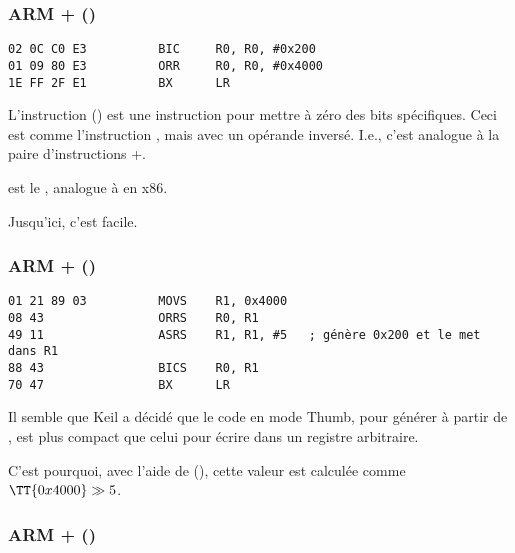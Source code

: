 \subsubsection{ARM + \OptimizingKeilVI (\ARMMode)}

\begin{lstlisting}[caption=\OptimizingKeilVI (\ARMMode),style=customasmARM]
02 0C C0 E3          BIC     R0, R0, #0x200
01 09 80 E3          ORR     R0, R0, #0x4000
1E FF 2F E1          BX      LR
\end{lstlisting}

L'instruction  () est une instruction pour mettre
à zéro des bits spécifiques. Ceci est comme l'instruction \AND, mais avec un opérande
inversé. I.e., c'est analogue à la paire d'instructions \NOT+\AND.

 est le , analogue à \OR en x86.

Jusqu'ici, c'est facile.

\subsubsection{ARM + \OptimizingKeilVI (\ThumbMode)}

\begin{lstlisting}[caption=\OptimizingKeilVI (\ThumbMode),style=customasmARM]
01 21 89 03          MOVS    R1, 0x4000
08 43                ORRS    R0, R1
49 11                ASRS    R1, R1, #5   ; génère 0x200 et le met dans R1
88 43                BICS    R0, R1
70 47                BX      LR
\end{lstlisting}

Il semble que Keil a décidé que le code en mode Thumb, pour générer  à
partir de , est plus compact que celui pour écrire  dans un
registre arbitraire.


C'est pourquoi, avec l'aide de  (\ASRdesc), cette valeur est calculée comme
$\TT{0x4000} \gg 5$.

\subsubsection{ARM + \OptimizingXcodeIV (\ARMMode)}
\label{anomaly:LLVM}
\myindex{\CompilerAnomaly}

